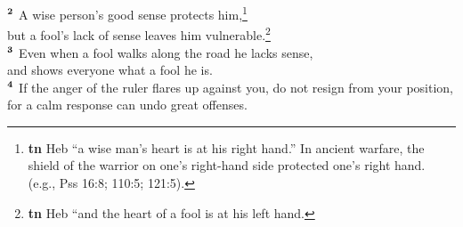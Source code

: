 \documentclass[10pt,a4paper,final, onecolumn]{article}
\renewcommand{\textsuperscript}[1]{\ensuremath{^{\textbf{\scriptsize #1}}}}
\begin{document}
    \textsuperscript{2} A wise person’s good sense protects him,\footnote{\textbf{tn} Heb ``a wise man’s heart is at his right hand.” In ancient warfare, the shield of the warrior on one’s right-hand side protected one’s right hand. (e.g., Pss 16:8; 110:5; 121:5).} \\
    but a fool’s lack of sense leaves him vulnerable.\footnote{\textbf{tn} Heb ``and the heart of a fool is at his left hand.} \\
    \textsuperscript{3} Even when a fool walks along the road he lacks sense, \\
    and shows everyone what a fool he is. \\
    \textsuperscript{4} If the anger of the ruler flares up against you, do not resign from your position, \\
    for a calm response can undo great offenses. \\






\end{document}
